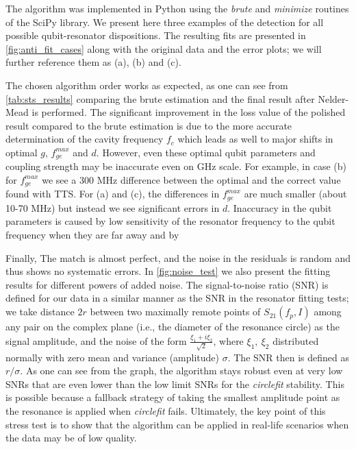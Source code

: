 \documentclass[%
 aip,
 draft,
 amsmath,amssymb,
 reprint,%
]{revtex4-1}
\begin{document}
The algorithm was implemented in Python using the \textit{brute} and \textit{minimize} routines of the SciPy\cite{scipy} library. We present here three examples of the detection for all possible qubit-resonator dispositions.  The resulting fits are presented in \autoref{fig:anti_fit_cases} along with the original data and the error plots; we will further reference them as (a), (b) and (c). 

The chosen algorithm order works as expected, as one can see from \autoref{tab:sts_results} comparing the brute estimation and  the final result after Nelder-Mead is performed. 	The significant improvement in the loss value of the polished result compared to the brute estimation is due to the more accurate determination of the cavity frequency $f_c$ which leads as well to major shifts in optimal $g$, $f_{ge}^{max}$ and $d$. However, even these optimal qubit parameters and coupling strength may be inaccurate even on GHz scale. For example, in case (b) for $f_{ge}^{max}$ we see a 300 MHz difference between the optimal and the correct value found with TTS. For (a) and (c), the differences in $f_{ge}^{max}$ are much smaller (about 10-70 MHz) but instead we see significant errors in $d$. Inaccuracy in the qubit parameters is caused by low sensitivity of the resonator frequency to the qubit frequency when they are far away and by 

Finally, The match is almost perfect, and the noise in the residuals is random and thus shows no systematic errors. In \autoref{fig:noise_test} we also present the fitting results for different powers of added noise. The signal-to-noise ratio (SNR) is defined for our data in a similar manner as the SNR in the resonator fitting tests\cite{probst2015}; we take distance $2r$ between two maximally remote points of $S_{21}(f_p, I)$ among any pair on the complex plane (i.e., the diameter of the resonance circle) as the signal amplitude, and the noise of the form $\frac{\xi_1+i\xi_2}{\sqrt 2}$, where $\xi_1,\ \xi_2$ distributed normally with zero mean and variance (amplitude) $\sigma$. The SNR then is defined as $r/\sigma$. As one can see from the graph, the algorithm stays robust even at very low SNRs that are even lower than the low limit SNRs for the \textit{circlefit} stability. This is possible because a fallback strategy of taking the smallest amplitude point as the resonance is applied when \textit{circlefit} fails. Ultimately, the key point of this stress test is to show that the algorithm can be applied in real-life scenarios when the data may be of low quality.
\end{document}
